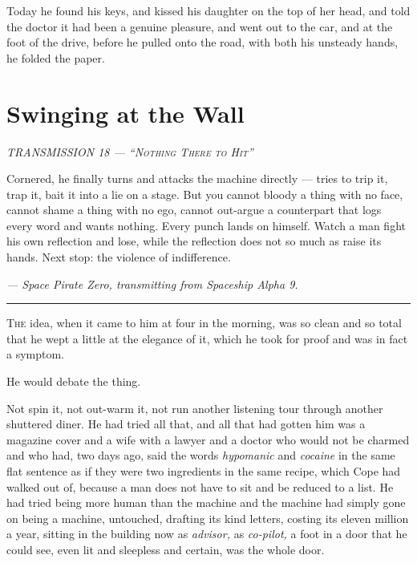 \documentclass[11pt,openany]{book}
\newcommand{\transheader}{\normalfont\footnotesize\scshape\letterspace}
\newcommand{\letterspace}{}
\newenvironment{transmission}{%
  \par\vspace{0.3\baselineskip}\begin{center}\begin{minipage}{0.88\textwidth}%
  \itshape\small\setlength{\parindent}{0pt}\setstretch{1.06}}%
  {\end{minipage}\end{center}\vspace{0.4\baselineskip}%
  \noindent\hfil\rule{0.35\textwidth}{0.3pt}\hfil\par\vspace{1.0\baselineskip}}
\begin{document}
Today he found his keys, and kissed his daughter on the top of her head, and told the doctor it had been a genuine pleasure, and went out to the car, and at the foot of the drive, before he pulled onto the road, with both his unsteady hands, he folded the paper.

\clearpage
\chapter{Swinging at the Wall}

\begin{transmission}
{\transheader TRANSMISSION 18 --- ``Nothing There to Hit''}\par\vspace{0.5em}
Cornered, he finally turns and attacks the machine directly --- tries to trip it, trap it, bait it into a lie on a stage. But you cannot bloody a thing with no face, cannot shame a thing with no ego, cannot out-argue a counterpart that logs every word and wants nothing. Every punch lands on himself. Watch a man fight his own reflection and lose, while the reflection does not so much as raise its hands. Next stop: the violence of indifference.\par
\vspace{0.5em}\hfill\textit{--- Space Pirate Zero, transmitting from Spaceship Alpha 9.}\par
\end{transmission}


\lettrine[lines=3, lhang=0.05, nindent=0.25em]{T}{he} idea, when it came to him at four in the morning, was so clean and so total that he wept a little at the elegance of it, which he took for proof and was in fact a symptom.

He would debate the thing.

Not spin it, not out-warm it, not run another listening tour through another shuttered diner. He had tried all that, and all that had gotten him was a magazine cover and a wife with a lawyer and a doctor who would not be charmed and who had, two days ago, said the words \textit{hypomanic} and \textit{cocaine} in the same flat sentence as if they were two ingredients in the same recipe, which Cope had walked out of, because a man does not have to sit and be reduced to a list. He had tried being more human than the machine and the machine had simply gone on being a machine, untouched, drafting its kind letters, costing its eleven million a year, sitting in the building now as \textit{advisor,} as \textit{co-pilot,} a foot in a door that he could see, even lit and sleepless and certain, was the whole door.
\end{document}
